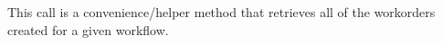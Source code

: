This call is a convenience/helper method that retrieves all of the workorders created for a given workflow.

